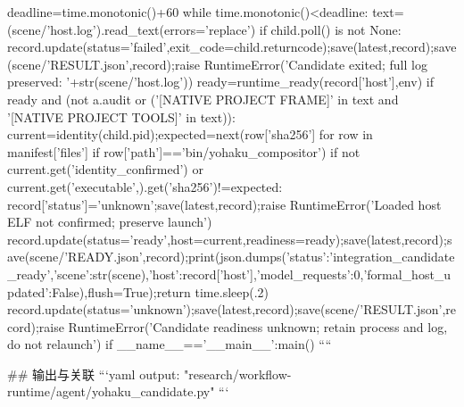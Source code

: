  deadline=time.monotonic()+60
 while time.monotonic()<deadline:
  text=(scene/'host.log').read_text(errors='replace')
  if child.poll() is not None:
   record.update(status='failed',exit_code=child.returncode);save(latest,record);save(scene/'RESULT.json',record);raise RuntimeError('Candidate exited; full log preserved: '+str(scene/'host.log'))
  ready=runtime_ready(record['host'],env)
  if ready and (not a.audit or ('[NATIVE PROJECT FRAME]' in text and '[NATIVE PROJECT TOOLS]' in text)):
   current=identity(child.pid);expected=next(row['sha256'] for row in manifest['files'] if row['path']=='bin/yohaku_compositor')
   if not current.get('identity_confirmed') or current.get('executable',{}).get('sha256')!=expected:
    record['status']='unknown';save(latest,record);raise RuntimeError('Loaded host ELF not confirmed; preserve launch')
   record.update(status='ready',host=current,readiness=ready);save(latest,record);save(scene/'READY.json',record);print(json.dumps({'status':'integration_candidate_ready','scene':str(scene),'host':record['host'],'model_requests':0,'formal_host_updated':False}),flush=True);return
  time.sleep(.2)
 record.update(status='unknown');save(latest,record);save(scene/'RESULT.json',record);raise RuntimeError('Candidate readiness unknown; retain process and log, do not relaunch')
if __name__=='__main__':main()
````

## 输出与关联
```yaml
output: "research/workflow-runtime/agent/yohaku_candidate.py"
```
